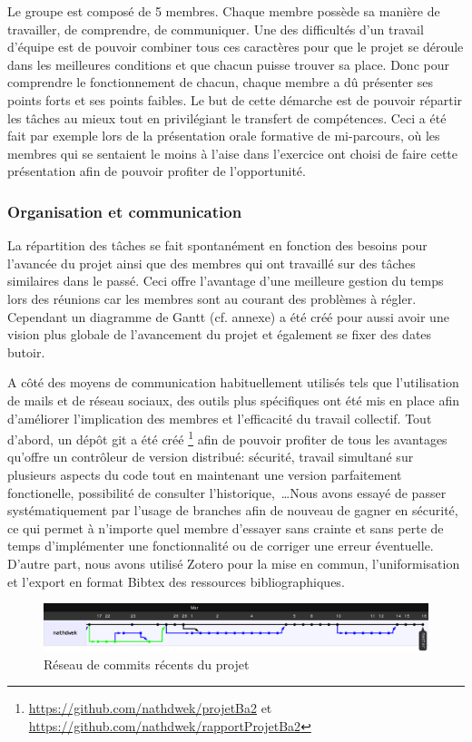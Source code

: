 Le groupe est composé de 5 membres. Chaque membre possède sa manière de travailler, de comprendre, de communiquer. Une des difficultés d’un travail d’équipe est de pouvoir combiner tous ces caractères pour que le projet se déroule dans les meilleures conditions et que chacun puisse trouver sa place. Donc pour comprendre le fonctionnement de chacun, chaque membre a dû présenter ses points forts et ses points faibles. Le but de cette démarche est de pouvoir répartir les tâches au mieux tout en privilégiant le transfert de compétences. Ceci a été fait par exemple lors de la présentation orale formative de mi-parcours, où les membres qui se sentaient le moins à l’aise dans l'exercice ont choisi de faire cette présentation afin de pouvoir profiter de l'opportunité.

\subsubsection{Organisation et communication}

La répartition des tâches se fait spontanément en fonction des besoins pour l’avancée du projet ainsi que des membres qui ont travaillé sur des tâches similaires dans le passé. Ceci offre l’avantage d’une meilleure gestion du temps lors des réunions car les membres sont au courant des problèmes à régler. Cependant un diagramme de Gantt (cf. annexe) a été créé pour aussi avoir une vision plus globale de l’avancement du projet et également se fixer des dates butoir.

A côté des moyens de communication habituellement utilisés tels que l'utilisation de mails et de réseau sociaux, des outils plus spécifiques ont été mis en place afin d'améliorer l'implication des membres et l'efficacité du travail collectif. Tout d'abord, un dépôt git a été créé \footnote{\url{https://github.com/nathdwek/projetBa2} et \url{https://github.com/nathdwek/rapportProjetBa2}} afin de pouvoir profiter de tous les avantages qu'offre un contrôleur de version distribué: sécurité, travail simultané sur plusieurs aspects du code tout en maintenant une version parfaitement fonctionelle, possibilité de consulter l'historique,~\ldots Nous avons essayé de passer systématiquement par l'usage de branches afin de nouveau de gagner en sécurité, ce qui permet à n'importe quel membre d'essayer sans crainte et sans perte de temps d'implémenter une fonctionnalité ou de corriger une erreur éventuelle. D'autre part, nous avons utilisé Zotero pour la mise en commun, l'uniformisation et l'export en format Bibtex des ressources bibliographiques.

\begin{figure}[htb]
  \centering
  \includegraphics[width=\textwidth]{pics/workflow.png}
    \caption{Réseau de commits récents du projet}
\end{figure}
